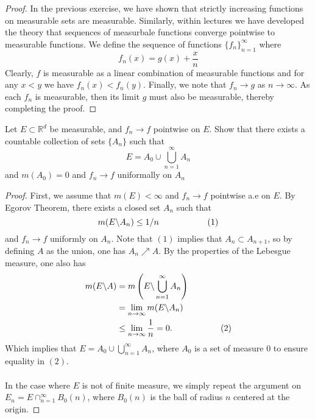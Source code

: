 \documentclass[nocolor]{report}
\begin{document}
\begin{proof}
    In the previous exercise, we have shown that strictly increasing functions on measurable sets are measurable. Similarly, within lectures we have developed the theory that sequences of measurbale functions converge pointwise to measurable functions. We define the sequence of functions $\{f_n\}_{n=1}^{\infty}$ where 
    $$f_n (x) = g(x) + \frac{x}{n}$$
    Clearly, $f$ is measurable as a linear combination of measurable functions and for any $x<y$ we have $f_n(x) < f_n(y)$. Finally, we note that $f_n \rightarrow g$ as $n\rightarrow\infty$. As each $f_n$ is measurable, then its limit $g$ must also be measurable, thereby completing the proof.
\end{proof}

\newpage
\begin{ex}[Question 2.] Let $E\subset\mathbb{R}^d$ be measurable, and $f_n \rightarrow f$ pointwise on $E$. Show that there exists a countable collection of sets $\{A_n\}$ such that 
$$E = A_0 \cup \bigcup_{n=1}^{\infty} A_n$$
and $m(A_0) = 0$ and $f_n\rightarrow f$ uniformally on $A_n$
\end{ex}
\begin{proof}
First, we assume that $m(E)<\infty$ and $f_n\rightarrow f$ pointwise a.e on $E$. By Egorov Theorem, there exists a closed set $A_n$ such that 
$$m(E\backslash A_n) \leq 1/n \hspace{20mm} (1)$$ 
and $f_n \rightarrow f$ uniformly on $A_n$. Note that $(1)$ implies that $A_n \subset A_{n+1}$, so by defining $A$ as the union, one has $A_n \nearrow A$. By the properties of the Lebesgue measure, one also has 
\begin{align*}
    m(E\backslash A) &= m\left(E\backslash \bigcup_{n=1}^{\infty}A_n\right) \\
                     &= \lim_{n\rightarrow\infty} m(E\backslash A_n) \\
                     &\leq \lim_{n\rightarrow\infty} \frac{1}{n} = 0. \hspace{20mm} (2)
\end{align*}        
Which implies that $E = A_0 \cup \bigcup_{n=1}^{\infty}A_n$, where $A_0$ is a set of measure 0 to ensure equality in $(2)$. \\
\\
In the case where $E$ is not of finite measure, we simply repeat the argument on $E_n = E \cap_{n=1}^{\infty}B_0(n)$, where $B_0(n)$ is the ball of radius $n$ centered at the origin. 
\end{proof}
\end{document}
